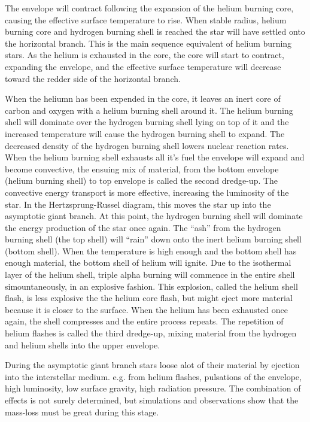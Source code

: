 The envelope will contract following the expansion of the helium burning core, causing the effective surface temperature to rise. When stable radius, helium burning core and hydrogen burning shell is reached the star will have settled onto the horizontal branch. This is the main sequence equivalent of helium burning stars. As the helium is exhausted in the core, the core will start to contract, expanding the envelope, and the effective surface temperature will decrease toward the redder side of the horizontal branch.

When the heliumn has been expended in the core, it leaves an inert core of carbon and oxygen with a helium burning shell around it.
The helium burning shell will dominate over the hydrogen burning shell lying on top of it and the increased temperature will cause the hydrogen burning shell to expand.
The decreased density of the hydrogen burning shell lowers nuclear reaction rates.
When the helium burning shell exhausts all it's fuel the envelope will expand and become convective, the ensuing mix of material, from the bottom envelope (helium burning shell) to top envelope is called the second dredge-up.
The convective energy transport is more effective, increasing the luminosity of the star.
In the Hertzsprung-Russel diagram, this moves the star up into the asymptotic giant branch.
At this point, the hydrogen burning shell will dominate the energy production of the star once again.
The ``ash'' from the hydrogen burning shell (the top shell) will ``rain'' down onto the inert helium burning shell (bottom shell).
When the temperature is high enough and the bottom shell has enough material, the bottom shell of helium will ignite.
Due to the isothermal layer of the helium shell, triple alpha burning will commence in the entire shell simountaneously, in an explosive fashion.
This explosion, called the helium shell flash, is less explosive the the helium core flash, but might eject more material because it is closer to the surface.
When the helium has been exhausted once again, the shell compresses and the entire process repeats. The repetition of helium flashes is called the third dredge-up, mixing material from the hydrogen and helium shells into the upper envelope.

During the asymptotic giant branch stars loose alot of their material by ejection into the interstellar medium. e.g. from helium flashes, pulsations of the envelope, high luminosity, low surface gravity, high radiation pressure.
The combination of effects is not surely determined, but simulations and observations show that the mass-loss must be great during this stage.

